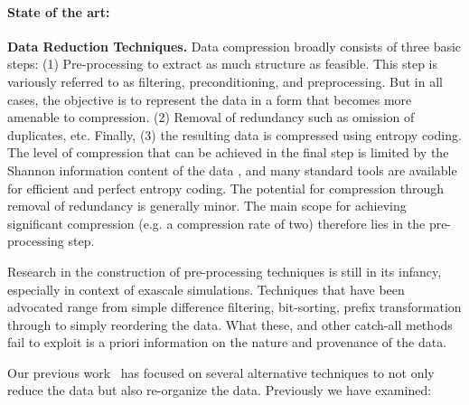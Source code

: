 \paragraph{State of the art:} {\bf Data Reduction Techniques.} Data compression
broadly consists of three basic steps: (1) Pre-processing to extract as much
structure as feasible. This step is variously referred to as filtering,
preconditioning, and preprocessing. But in all cases, the objective is to
represent the data in a form that becomes more amenable to compression.  (2)
Removal of redundancy such as omission of duplicates, etc.  Finally, (3) the
resulting data is compressed using entropy coding. The level of compression
that can be achieved in the final step is limited by the Shannon information
content of the data \cite{Gray:book}, and many standard tools are available for
efficient and perfect entropy coding. The potential for compression through
removal of redundancy is generally minor. The main scope for achieving
significant compression (e.g. a compression rate of two) therefore
lies in the pre-processing step.

Research in the construction of pre-processing techniques is still in its
infancy, especially in context of exascale simulations. Techniques that have
been advocated range from simple difference filtering, bit-sorting, prefix
transformation through to simply reordering the data.  What these, and other
catch-all methods fail to exploit is a priori information on the nature and
provenance of the data. 

Our previous
work~\cite{lakshminarasimhan2011compressing,%
gong2012multi,jenkins2012byte,gong2013parlo,boyuka2014transparent,%
tang2014improving}
has focused on several alternative techniques to not only reduce the data
but also re-organize the data. Previously we have examined:


